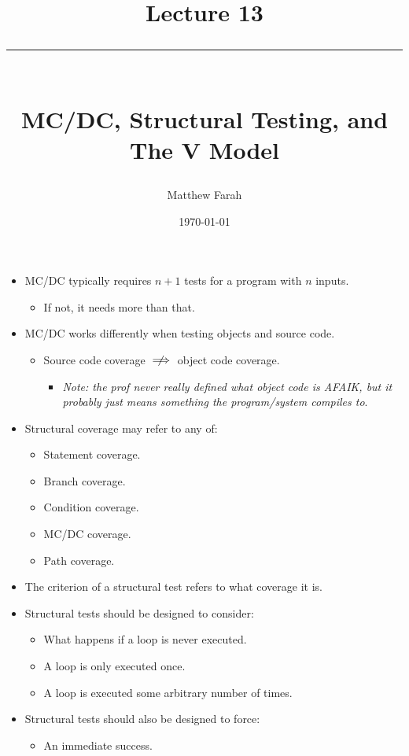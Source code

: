 \documentclass{article}
\date{
	\vspace{-.75em}
	{\large \today}
}
\title{
	\vspace*{-1.5em}
	{\Huge Lecture 13} \\
	\vspace{-1em}
	\rule{\textwidth/4}{.01em} \\
	\vspace{-.25em}
	{\Large MC/DC, Structural Testing, and The V Model}
	\vspace{-.75em}
}
\author{
	{\large Matthew Farah}
}
\begin{document}
\maketitle
\pagestyle{fancy}

\fi

\begin{itemize}
	\item MC/DC typically requires $n + 1$ tests for a program with $n$ inputs.
	\begin{itemize}
		\item If not, it needs more than that.
	\end{itemize}
	\item MC/DC works differently when testing objects and source code.
	\begin{itemize}
		\item Source code coverage $\centernot\implies$ object code coverage.
		\begin{itemize}
			\item \emph{Note: the prof never really defined what object code is AFAIK, but it probably just means something the program/system compiles to}.
		\end{itemize}
	\end{itemize}
	\item Structural coverage may refer to any of:
	\begin{itemize}
		\item Statement coverage.
		\item Branch coverage.
		\item Condition coverage.
		\item MC/DC coverage.
		\item Path coverage.
	\end{itemize}
	\item The criterion of a structural test refers to what coverage it is.
	\item Structural tests should be designed to consider:
	\begin{itemize}
		\item What happens if a loop is never executed.
		\item A loop is only executed once.
		\item A loop is executed some arbitrary number of times.
	\end{itemize}
	\item Structural tests should also be designed to force:
	\begin{itemize}
		\item An immediate success.

\end{itemize}
\end{itemize}
\end{document}
